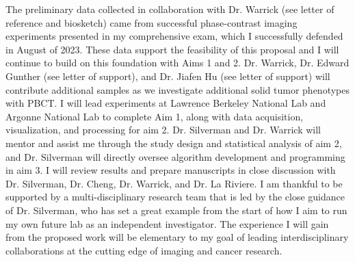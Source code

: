 \documentclass{NIHGrant}
\begin{document}
The preliminary data collected in collaboration with Dr. Warrick (see letter of reference and biosketch) came from successful phase-contrast imaging experiments presented in my comprehensive exam, which I successfully defended in August of 2023. These data support the feasibility of this proposal and I will continue to build on this foundation with Aims 1 and 2. Dr. Warrick, Dr. Edward Gunther (see letter of support), and Dr. Jiafen Hu (see letter of support) will contribute additional samples as we investigate additional solid tumor phenotypes with PBCT. I will lead experiments at Lawrence Berkeley National Lab and Argonne National Lab to complete Aim 1, along with data acquisition, visualization, and processing for aim 2. Dr. Silverman and Dr. Warrick will mentor and assist me through the study design and statistical analysis of aim 2, and Dr. Silverman will directly oversee algorithm development and programming in aim 3. I will review results and prepare manuscripts in close discussion with Dr. Silverman, Dr. Cheng, Dr. Warrick, and Dr. La Riviere. I am thankful to be supported by a multi-disciplinary research team that is led by the close guidance of Dr. Silverman, who has set a great example from the start of how I aim to run my own future lab as an independent investigator. The experience I will gain from the proposed work will be elementary to my goal of leading interdisciplinary collaborations at the cutting edge of imaging and cancer research.


\end{document}
